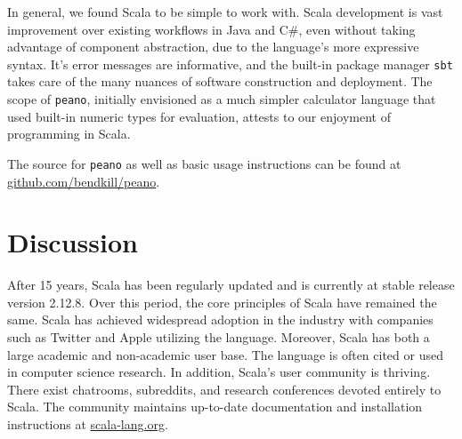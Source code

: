 \documentclass[jou,apacite]{IEEEtran}
\begin{document}
In general, we found Scala to be simple to work with. Scala development is vast
improvement over existing workflows in Java and C\#, even without taking
advantage of component abstraction, due to the language's more expressive
syntax. It's error messages are informative, and the built-in package manager
\texttt{sbt} takes care of the many nuances of software construction and
deployment. The scope of \texttt{peano}, initially envisioned as a much simpler
calculator language that used built-in numeric types for evaluation, attests to
our enjoyment of programming in Scala.

The source for \texttt{peano} as well as basic usage instructions can be found at
\href{https://www.github.com/bendkill/peano}{github.com/bendkill/peano}.

\section{Discussion}
\label{sec:discussion}

After 15 years, Scala has been regularly updated and is currently at stable
release version 2.12.8. Over this period, the core principles of Scala have
remained the same. Scala has achieved widespread adoption in the industry with
companies such as Twitter and Apple utilizing the language. Moreover, Scala has
both a large academic and non-academic user base. The language is often cited or
used in computer science research. In addition, Scala's user community is
thriving. There exist chatrooms, subreddits, and research conferences devoted
entirely to Scala. The community maintains up-to-date documentation and
installation instructions at \href{https://www.scala-lang.org/}{scala-lang.org}.




\end{document}
